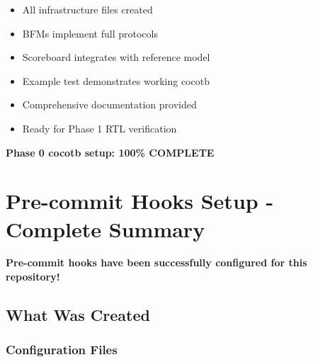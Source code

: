 \begin{record}

\begin{itemize}
\tightlist
\item
  \ok{} All infrastructure files created
\item
  \ok{} BFMs implement full protocols
\item
  \ok{} Scoreboard integrates with reference model
\item
  \ok{} Example test demonstrates working cocotb
\item
  \ok{} Comprehensive documentation provided
\item
  \ok{} Ready for Phase 1 RTL verification
\end{itemize}

\textbf{Phase 0 cocotb setup: 100\% COMPLETE} \ok{}

\end{record}

\section{Pre-commit Hooks Setup - Complete Summary}\label{cr:app:archive-pre-commit-setup-summary}

\begin{record}

\ok{} \textbf{Pre-commit hooks have been successfully configured for
this repository!}

\end{record}

\subsection{What Was Created}\label{cr:app:archive-pre-commit-setup-summary:what-was-created}

\subsubsection{Configuration Files}\label{cr:app:archive-pre-commit-setup-summary:configuration-files}

